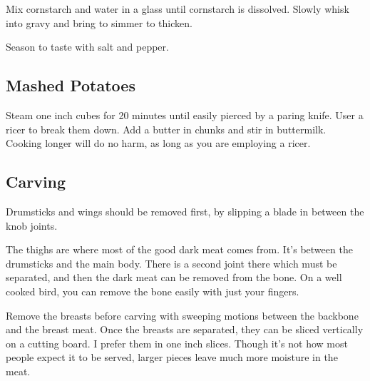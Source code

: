 \begin{recipe}
Mix cornstarch and water in a glass until cornstarch is dissolved. Slowly whisk into gravy and bring to simmer to thicken.

Season to taste with salt and pepper.

\subsection{Mashed Potatoes}


Steam one inch cubes for 20 minutes until easily pierced by a paring knife. User a ricer to break them down. Add a butter in chunks and stir in buttermilk. Cooking longer will do no harm, as long as you are employing a ricer.

\newpage
\subsection{Carving}

Drumsticks and wings should be removed first, by slipping a blade in between the knob joints.

The thighs are where most of the good dark meat comes from. It's between the drumsticks and the main body. There is a second joint there which must be separated, and then the dark meat can be removed from the bone. On a well cooked bird, you can remove the bone easily with just your fingers.

Remove the breasts before carving with sweeping motions between the backbone and the breast meat.
Once the breasts are separated, they can be sliced vertically on a cutting board.
I prefer them in one inch slices.
Though it's not how most people expect it to be served, larger pieces leave much more moisture in the meat.

\end{recipe}
